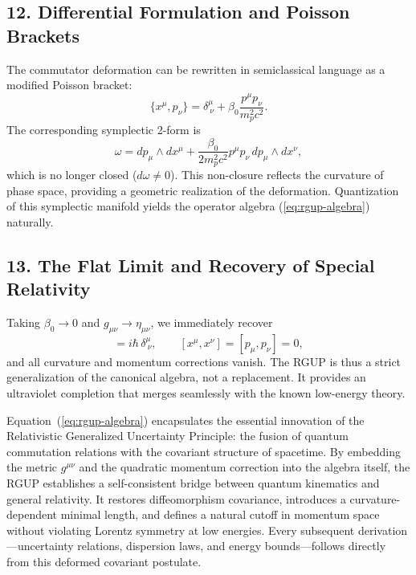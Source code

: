 \documentclass[11pt,oneside]{book}
\newenvironment{booknote}{
  \begin{tcolorbox}[
    colback=gray!3!white,
    colframe=gray!45!black,
    fonttitle=\bfseries,
    title=\textbf{Book Note},
  ]
}{\end{tcolorbox}}
\numberwithin{equation}{chapter}
\newcommand{\mpx}{m_p}               %
\newcommand{\betaz}{\beta_0}
\begin{document}
\subsection*{12. Differential Formulation and Poisson Brackets}

The commutator deformation can be rewritten in semiclassical language as a modified Poisson bracket:
\begin{equation}
\{x^\mu,p_\nu\} = \delta^\mu_{\ \nu}
+ \betaz\frac{p^\mu p_\nu}{\mpx^2 c^2}.
\end{equation}
The corresponding symplectic 2-form is
\begin{equation}
\omega = dp_\mu \wedge dx^\mu
+ \frac{\betaz}{2\mpx^2 c^2}p^\mu p_\nu\,dp_\mu\wedge dx^\nu,
\end{equation}
which is no longer closed ($d\omega\neq0$).  
This non-closure reflects the curvature of phase space, providing a geometric realization
of the deformation.  
Quantization of this symplectic manifold yields the operator algebra (\ref{eq:rgup-algebra}) naturally.

\subsection*{13. The Flat Limit and Recovery of Special Relativity}

Taking $\betaz\to0$ and $g_{\mu\nu}\to\eta_{\mu\nu}$,
we immediately recover
\begin{equation}
[x^\mu,p_\nu]=i\hbar\,\delta^\mu_{\ \nu},\qquad [x^\mu,x^\nu]=[p_\mu,p_\nu]=0,
\end{equation}
and all curvature and momentum corrections vanish.
The RGUP is thus a strict generalization of the canonical algebra,
not a replacement.
It provides an ultraviolet completion that merges seamlessly
with the known low-energy theory. \vspace{0.8em}

\begin{booknote}
Equation~(\ref{eq:rgup-algebra}) encapsulates the essential innovation of the
Relativistic Generalized Uncertainty Principle: the fusion of quantum commutation
relations with the covariant structure of spacetime.
By embedding the metric $g^{\mu\nu}$ and the quadratic momentum correction into
the algebra itself, the RGUP establishes a self-consistent bridge between
quantum kinematics and general relativity.  
It restores diffeomorphism covariance, introduces a curvature-dependent minimal
length, and defines a natural cutoff in momentum space without violating
Lorentz symmetry at low energies.
Every subsequent derivation—uncertainty relations, dispersion laws, and energy
bounds—follows directly from this deformed covariant postulate.
\end{booknote}
\end{document}
